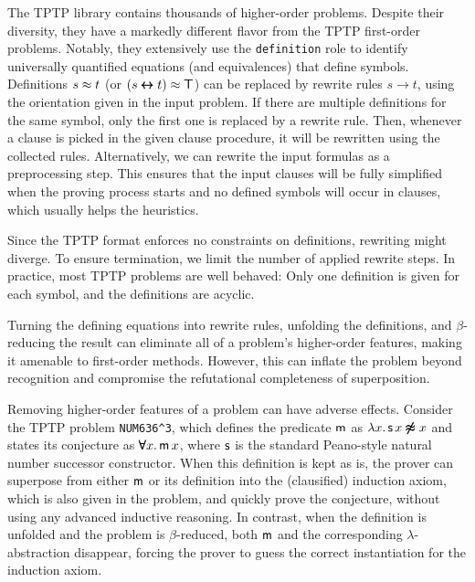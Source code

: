 \documentclass[smallcondensed,draft]{svjour3}     %
\begin{document}
The TPTP library contains thousands of higher-order problems. Despite their
diversity, they have a markedly different flavor from the TPTP first-order
problems. Notably, they extensively use the \verb|definition| role to identify
universally quantified equations (and equivalences) that define symbols.
%
Definitions $s \approx t$ (or $(s \pmb\leftrightarrow t) \approx \pmb\top$) can be replaced by rewrite
rules $s \rightarrow t$,
using the orientation given in the input problem. If there are multiple
definitions for the same symbol, only the first one is replaced by a rewrite rule.
Then, whenever a clause is picked in the given clause procedure, it will be rewritten
using the collected rules.
Alternatively, we can rewrite
the input formulas as a preprocessing step. This ensures that the input
clauses will be fully simplified when the proving process starts and no
defined symbols will occur in clauses, which usually helps the heuristics.

Since the TPTP format enforces no constraints on
definitions, rewriting might diverge. To ensure
termination, we limit the number of applied rewrite steps. In
practice, most TPTP problems are well behaved: Only one
definition is given for each symbol, and the definitions are acyclic.

Turning the defining equations into rewrite rules, unfolding the definitions, and
$\beta$-reduc\-ing the result can eliminate all of a problem's higher-order features, making
it amenable to first-order methods. However, this can inflate the problem
beyond recognition and compromise the refutational completeness of
superposition.

\begin{exa} 
  Removing higher-order features of a problem can have adverse effects.
  Consider the TPTP problem \texttt{NUM636\^{}3}, which defines the predicate $\mathsf{m}$
  as $\lambda x.\, \mathsf{s} \, x \pmb{\not\approx} x$ and states its conjecture as $\pmb\forall
  x.\, \mathsf{m} \, x $, where $\mathsf{s}$ is the standard Peano-style natural number
  successor constructor. When this definition is kept as is, the
  prover can superpose from either $\mathsf{m}$ or its definition into the
  (clausified) induction axiom, which is also given in the problem, and quickly prove
  the conjecture, without using any advanced inductive reasoning. In contrast,
  when the definition is
  unfolded and the problem is $\beta$-reduced, both $\mathsf{m}$ and the
  corresponding $\lambda$-abstraction disappear, forcing the prover to guess the
  correct instantiation for the induction axiom.
\end{exa}
\end{document}
